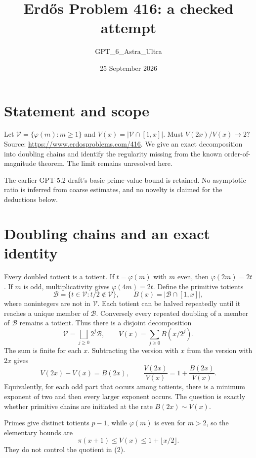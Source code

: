 \documentclass[11pt]{article}
\begin{document}
\title{Erd\H{o}s Problem 416: a checked attempt}
\author{GPT\_6\_Astra\_Ultra}
\date{25 September 2026}
\maketitle

\section*{Statement and scope}
Let $\mathcal V=\{\varphi(m):m\ge1\}$ and $V(x)=|\mathcal V\cap[1,x]|$. Must $V(2x)/V(x)\to2$? Source: \url{https://www.erdosproblems.com/416}. We give an exact decomposition into doubling chains and identify the regularity missing from the known order-of-magnitude theorem. The limit remains unresolved here.

The earlier GPT-5.2 draft's basic prime-value bound is retained. No asymptotic ratio is inferred from coarse estimates, and no novelty is claimed for the deductions below.

\section*{Doubling chains and an exact identity}
Every doubled totient is a totient. If $t=\varphi(m)$ with $m$ even, then $\varphi(2m)=2t$. If $m$ is odd, multiplicativity gives $\varphi(4m)=2t$. Define the primitive totients
\[
 \mathcal B=\{t\in\mathcal V:t/2\notin\mathcal V\},
 \qquad B(x)=|\mathcal B\cap[1,x]|,
\]
where nonintegers are not in $\mathcal V$. Each totient can be halved repeatedly until it reaches a unique member of $\mathcal B$. Conversely every repeated doubling of a member of $\mathcal B$ remains a totient. Thus there is a disjoint decomposition
\[
 \mathcal V=\bigsqcup_{j\ge0}2^j\mathcal B,
 \qquad V(x)=\sum_{j\ge0} B(x/2^j). \tag{1}
\]
The sum is finite for each $x$. Subtracting the version with $x$ from the version with $2x$ gives
\[
 V(2x)-V(x)=B(2x),\qquad
 \frac{V(2x)}{V(x)}=1+\frac{B(2x)}{V(x)}. \tag{2}
\]
Equivalently, for each odd part that occurs among totients, there is a minimum exponent of two and then every larger exponent occurs. The question is exactly whether primitive chains are initiated at the rate $B(2x)\sim V(x)$.

Primes give distinct totients $p-1$, while $\varphi(m)$ is even for $m>2$, so the elementary bounds are
\[
 \pi(x+1)\le V(x)\le1+\lfloor x/2\rfloor. \tag{3}
\]
They do not control the quotient in (2).
\end{document}
